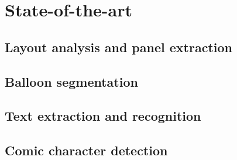\chapter{State-of-the-art} %
\label{chap:sota}
\graphicspath{{./chapters/3-state-of-the-art/figs/}}


\section{Layout analysis and panel extraction}
\label{sec:sota:layout_panel}


\section{Balloon segmentation}
\label{sec:sota:balloon_segmentation}


\section{Text extraction and recognition}
\label{sec:sota:text}


\section{Comic character detection}
\label{sec:sota:comic_character}

